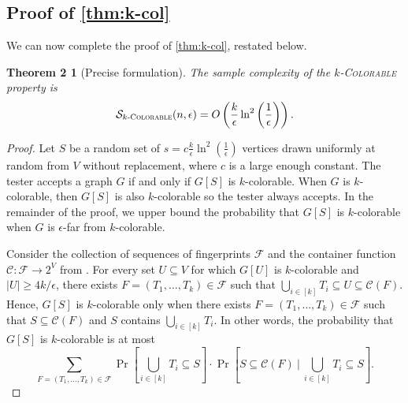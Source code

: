 \documentclass[11pt]{article}
\begin{document}
\subsection{Proof of \autoref{thm:k-col}}
\label{sect:col-proof}
We can now complete the proof of \autoref{thm:k-col}, restated below.

\newtheorem*{col-thm-precise}{Theorem 2}
\begin{col-thm-precise}[Precise formulation]
The sample complexity of the \textsc{$k$-Colorable} property is 
\[
\mathcal{S}_{k\textsc{-Colorable}}(n,\epsilon) = O\left(\frac{k}{\epsilon} \ln^2\left(\frac{1}{\epsilon}\right)\right).
\]
\end{col-thm-precise}

\begin{proof}
Let $S$ be a random set of $s = c\frac{k}{\epsilon} \ln^2\left(\frac{1}{\epsilon}\right)$ vertices drawn uniformly at random from $V$ without replacement, where $c$ is a large enough constant. The tester accepts a graph $G$ if and only if $G[S]$ is $k$-colorable. When $G$ is $k$-colorable, then $G[S]$ is also $k$-colorable so the tester always accepts. 
In the remainder of the proof, we upper bound the probability that $G[S]$ is $k$-colorable when $G$ is $\epsilon$-far from $k$-colorable.

Consider the collection of sequences of fingerprints $\mathcal{F}$ and the container function $\mathcal{C} \colon \mathcal{F} \rightarrow 2^V$ from .
For every set $U \subseteq V$ for which $G[U]$ is $k$-colorable and $|U| \geq 4k/\epsilon$, there exists $F=(T_1,\dots,T_k) \in \mathcal{F}$ such that $\bigcup_{i \in [k]} T_i \subseteq U \subseteq \mathcal{C}(F).$
Hence, $G[S]$ is $k$-colorable only when there exists $F=(T_1,\dots,T_k) \in \mathcal{F}$ such that $S \subseteq \mathcal{C}(F)$ and $S$ contains $\bigcup_{i \in [k]}T_i.$
In other words, the probability that $G[S]$ is $k$-colorable is at most
\[\sum_{F=(T_1,\dots,T_k) \in \mathcal{F}} \Pr\left[\bigcup_{i \in [k]} T_i \subseteq S\right] \cdot \Pr\left[S \subseteq \mathcal{C}(F) ~\bigg|~ \bigcup_{i \in [k]} T_i \subseteq S\right].\]


\end{proof}
\end{document}
